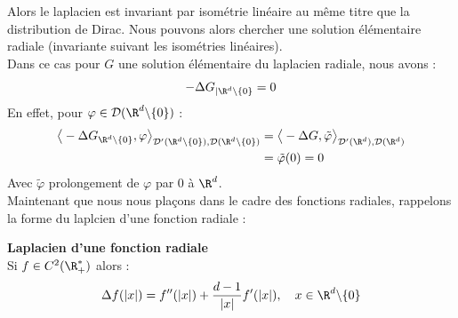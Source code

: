 Alors le laplacien est invariant par isométrie linéaire au même titre que la distribution de Dirac.
Nous pouvons alors chercher une solution élémentaire radiale (invariante suivant les isométries linéaires). \\
Dans ce cas pour $G$ une solution élémentaire du laplacien radiale, nous avons :
$$-\Delta G_{|\R^d \backslash \{0\} } = 0$$
En effet, pour $\varphi \in \mathcal{D}(\R^d\backslash \{0\})$ :
\begin{align*}
    \big< -\Delta G_{\R^d \backslash \{0\}} , \varphi \big>_{\mathcal{D}'(\R^d \backslash \{0\}),\mathcal{D}(\R^d \backslash \{0\})} &= \big< -\Delta G, \tilde{\varphi} \big>_{\mathcal{D}'(\R^d),\mathcal{D}(\R^d)} \\
    &=  \tilde{\varphi}(0) = 0
\end{align*}
Avec $\tilde{\varphi}$ prolongement de $\varphi$ par 0 à $\R^d$. \\
Maintenant que nous nous plaçons dans le cadre des fonctions radiales, rappelons la forme du laplcien d'une fonction radiale :
\begin{lemmabox}
    \begin{lemma}\textbf{Laplacien d'une fonction radiale}\\
        Si $f \in C^2(\R_+^*)$ alors :
        $$ \Delta f(|x|) = f''(|x|) + \frac{d-1}{|x|}f'(|x|), \quad x \in \R^d \backslash \{0\} $$
    \end{lemma}
\end{lemmabox}
